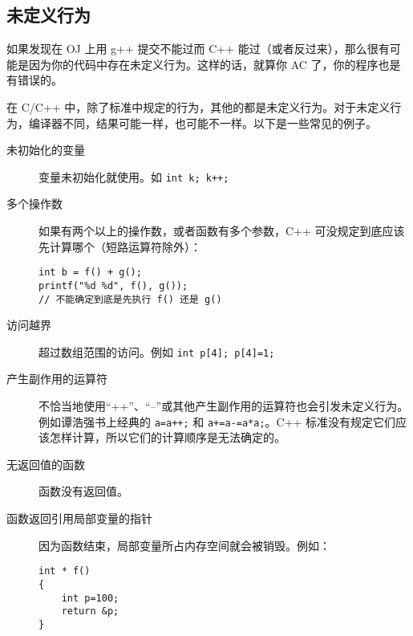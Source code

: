 	\subsection{未定义行为}
		如果发现在 OJ 上用 g++ 提交不能过而 C++ 能过（或者反过来），那么很有可能是因为你的代码中存在未定义行为。这样的话，就算你 AC 了，你的程序也是有错误的。
		
		在 C/C++ 中，除了标准中规定的行为，其他的都是未定义行为。对于未定义行为，编译器不同，结果可能一样，也可能不一样。以下是一些常见的例子。
		
		\begin{description}
			\item[未初始化的变量] 变量未初始化就使用。如 \lstinline|int k; k++;|
			\item[多个操作数] 如果有两个以上的操作数，或者函数有多个参数，C++ 可没规定到底应该先计算哪个（短路运算符除外）：
			
\begin{lstlisting}
int b = f() + g();  
printf("%d %d", f(), g());
// 不能确定到底是先执行 f() 还是 g()
\end{lstlisting}

			\item[访问越界] 超过数组范围的访问。例如 \lstinline|int p[4]; p[4]=1;|
			\item[产生副作用的运算符] 不恰当地使用“++”、“--”或其他产生副作用的运算符也会引发未定义行为。例如谭浩强书上经典的 \lstinline|a=a++;| 和 \lstinline|a+=a-=a*a;|。C++ 标准没有规定它们应该怎样计算，所以它们的计算顺序是无法确定的。
			\item[无返回值的函数] 函数没有返回值。
			\item[函数返回引用局部变量的指针] 因为函数结束，局部变量所占内存空间就会被销毁。例如：

\begin{lstlisting}
int * f()
{
	int p=100;
	return &p;
}
\end{lstlisting}
		\end{description}
